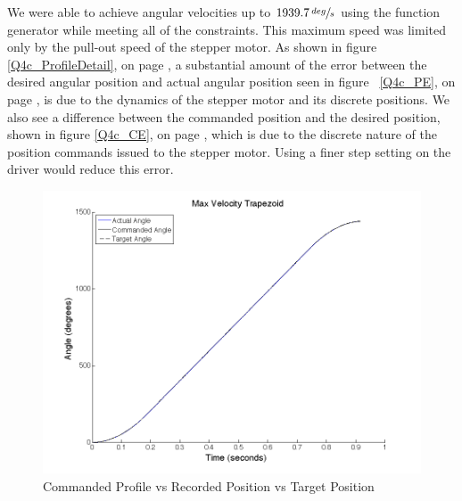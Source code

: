\documentclass{article}
\theoremstyle{plain}
\theoremstyle{definition}
\theoremstyle{remark}
\begin{document}
We were able to achieve angular velocities up to $1939.7 \, \sfrac{deg}{s}$ using the function generator while meeting all of the constraints.  This maximum speed was limited only by the pull-out speed of the stepper motor.  As shown in figure \ref{Q4c_ProfileDetail}, on  page \pageref{Q4c_ProfileDetail}, a substantial amount of the error between the desired angular position and actual angular position seen in figure ~\ref{Q4c_PE}, on page \pageref{Q4c_PE}, is due to the dynamics of the stepper motor and its discrete positions.  We also see a difference between the commanded position and the desired position, shown in figure \ref{Q4c_CE}, on page \pageref{Q4c_CE}, which is due to the discrete nature of the position commands issued to the stepper motor.  Using a finer step setting on the driver would reduce this error.\\

\begin{figure}[hbt]
\begin{center}
\includegraphics[width = 12cm]{4cProfile.png}
\caption{Commanded Profile vs Recorded Position vs Target Position}
\label{Q4c_Profile}
\end{center}
\end{figure}
\end{document}

